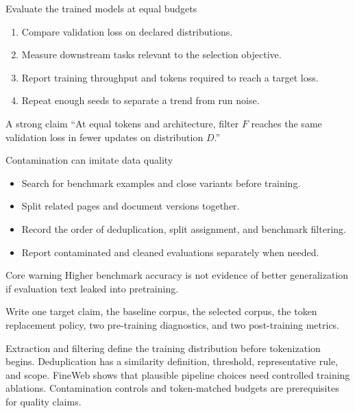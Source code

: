 \documentclass[handout]{beamer}
\begin{document}
\begin{frame}{Evaluate the trained models at equal budgets}
  \begin{enumerate}
    \setlength{\itemsep}{7pt}
    \item Compare validation loss on declared distributions.
    \item Measure downstream tasks relevant to the selection objective.
    \item Report training throughput and tokens required to reach a target loss.
    \item Repeat enough seeds to separate a trend from run noise.
  \end{enumerate}
  \begin{block}{A strong claim}
    ``At equal tokens and architecture, filter $F$ reaches the same validation loss in fewer updates on distribution $D$.''
  \end{block}
\end{frame}

\begin{frame}{Contamination can imitate data quality}
  \begin{itemize}
    \setlength{\itemsep}{8pt}
    \item Search for benchmark examples and close variants before training.
    \item Split related pages and document versions together.
    \item Record the order of deduplication, split assignment, and benchmark filtering.
    \item Report contaminated and cleaned evaluations separately when needed.
  \end{itemize}
  \begin{alertblock}{Core warning}
    Higher benchmark accuracy is not evidence of better generalization if evaluation text leaked into pretraining.
  \end{alertblock}
\end{frame}

  {Write one target claim, the baseline corpus, the selected corpus, the token replacement policy, two pre-training diagnostics, and two post-training metrics.}

\takeaways
  {Extraction and filtering define the training distribution before tokenization begins.}
  {Deduplication has a similarity definition, threshold, representative rule, and scope.}
  {FineWeb shows that plausible pipeline choices need controlled training ablations.}
  {Contamination controls and token-matched budgets are prerequisites for quality claims.}
\end{document}

